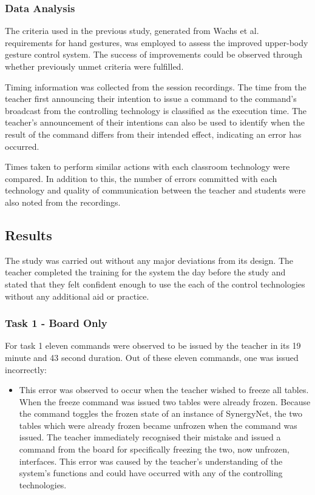 \documentclass[link]{IWCOMP}
\begin{document}
\subsubsection{Data Analysis}
\label{subsec:studyPhase2Analysis}

The criteria used in the previous study, generated from Wachs et al.~\cite{Wachs2011} requirements for hand gestures, was employed to assess the improved upper-body gesture control system.
The success of improvements could be observed through whether previously unmet criteria were fulfilled.

Timing information was collected from the session recordings.
The time from the teacher first announcing their intention to issue a command to the command's broadcast from the controlling technology is classified as the execution time.
The teacher's announcement of their intentions can also be used to identify when the result of the command differs from their intended effect, indicating an error has occurred.

Times taken to perform similar actions with each classroom technology were compared.
In addition to this, the number of errors committed with each technology and quality of communication between the teacher and students were also noted from the recordings.

\subsection{Results}
\label{subsec:studyPhase2Results}


The study was carried out without any major deviations from its design.
The teacher completed the training for the system the day before the study and stated that they felt confident enough to use the each of the control technologies without any additional aid or practice.

\subsubsection{Task 1 - Board Only}
\label{subsubsec:studyPhase2ResultsTask1}

For task 1 eleven commands were observed to be issued by the teacher in its 19 minute and 43 second duration.
Out of these eleven commands, one was issued incorrectly:

\begin{itemize}
\item This error was observed to occur when the teacher wished to freeze all tables.
When the freeze command was issued two tables were already frozen.
Because the command toggles the frozen state of an instance of SynergyNet, the two tables which were already frozen became unfrozen when the command was issued.
The teacher immediately recognised their mistake and issued a command from the board for specifically freezing the two, now unfrozen, interfaces.
This error was caused by the teacher's understanding of the system's functions and could have occurred with any of the controlling technologies.
\end{itemize}
\end{document}
